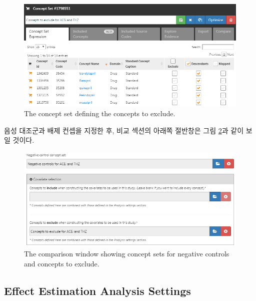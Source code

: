\documentclass[11pt]{book}
\theoremstyle{definition}
\theoremstyle{definition}
\theoremstyle{definition}
\theoremstyle{remark}
\begin{document}
\begin{figure}

{\centering \includegraphics[width=1\linewidth]{images/PopulationLevelEstimation/covsToExclude} 

}

\caption{The concept set defining the concepts to exclude.}\label{fig:covsToExclude}
\end{figure}

음성 대조군과 배제 컨셉을 지정한 후, 비교 섹션의 아래쪽 절반창은 그림
\ref{fig:comparisons2}과 같이 보일 것이다.

\begin{figure}

{\centering \includegraphics[width=1\linewidth]{images/PopulationLevelEstimation/comparisons2} 

}

\caption{The comparison window showing concept sets for negative controls and concepts to exclude.}\label{fig:comparisons2}
\end{figure}

\subsection{Effect Estimation Analysis
Settings}\label{effect-estimation-analysis-settings}
\end{document}
